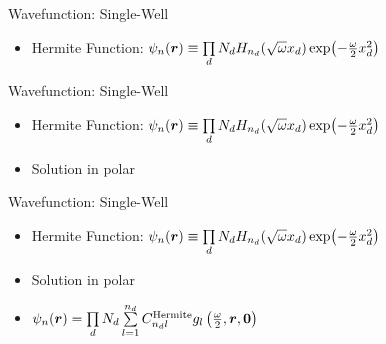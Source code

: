 \documentclass[10pt, t, xcolor=dvipsnames]{beamer}
\begin{document}
\begin{frame}[fragile]{Wavefunction: Single-Well}
    \begin{itemize}
        \item Hermite Function: $\psi_n(\bm{{r}}) \equiv \prod\limits_d N_d
            H_{n_d}(\sqrt{\omega}x_d)\exp(-\frac{\omega}{2}x^2_d)$
    \end{itemize}
\end{frame}

\begin{frame}[fragile]{Wavefunction: Single-Well}
    \begin{itemize}
        \item Hermite Function: $\psi_n(\bm{{r}}) \equiv \prod\limits_d N_d
            H_{n_d}(\sqrt{\omega}x_d)\exp(-\frac{\omega}{2}x^2_d)$
        \item Solution in polar
    \end{itemize}
\end{frame}

\begin{frame}[fragile]{Wavefunction: Single-Well}
    \begin{itemize}
        \item Hermite Function: $\psi_n(\bm{{r}}) \equiv \prod\limits_d N_d
            H_{n_d}(\sqrt{\omega}x_d)\exp(-\frac{\omega}{2}x^2_d)$
        \item Solution in polar
        \item $\psi_n(\bm{{r}}) = \prod\limits_d N_d \sum\limits^{n_d}_{l=1}
            C^{\text{Hermite}}_{n_dl}
            g_l\left(\frac{\omega}{2},\bm{{r}},\bm{{0}}\right)$
    \end{itemize}
\end{frame}
\end{document}
